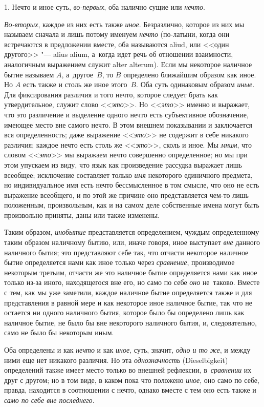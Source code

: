 1. Нечто и иное суть, {\em во-первых}, оба налично сущие или {\em нечто}.

{\em Во-вторых}, каждое из них есть также {\em иное}. Безразлично, которое из
них мы называем сначала и лишь потому именуем {\em нечто} (по-латыни, когда они
встречаются в предложении вместе, оба называются aliud, или <<один другого>>
"--- alius alium, а~когда идет речь об отношении взаимности, аналогичным
выражением служит alter alterum). Если мы некоторое наличное бытие называем
$A$, а~другое~$B$, то $B$ определено ближайшим образом как иное. Но $A$ есть
также и столь же иное этого~$B$. Оба суть одинаковым образом {\em иные}. Для
фиксирования различия и того нечто, которое следует брать как утвердительное,
служит слово <<{\em это}>>. Но <<{\em это}>> именно и выражает, что это
различение и выделение одного нечто есть субъективное обозначение, имеющее
место вне самого нечто. В этом внешнем показывании и заключается вся
определенность; даже выражение <<{\em это}>> не содержит в себе никакого
различия; каждое нечто есть столь же <<{\em это}>>, сколь и иное. Мы
{\em мним}, что словом <<{\em это}>> мы выражаем нечто совершенно определенное;
но мы при этом упускаем из виду, что язык как произведение рассудка выражает
лишь всеобщее; исключение составляет только {\em имя} некоторого единичного
предмета, но индивидуальное имя есть нечто бессмысленное в том смысле, что оно
не есть выражение всеобщего, и по этой же причине оно представляется чем-то
лишь положенным, произвольным, как и на самом деле собственные имена могут быть
произвольно приняты, даны или также изменены.

Таким образом, {\em инобытие} представляется определением, чуждым определенному
таким образом наличному бытию, или, иначе говоря, иное выступает {\em вне}
данного наличного бытия; это представляют себе так, что отчасти некоторое
наличное бытие определяется нами как иное только через {\em сравнение},
производимое некоторым третьим, отчасти же это наличное бытие определяется нами
как иное только из-за иного, находящегося вне его, но само по себе {\em оно}
не~таково. Вместе с тем, как мы уже заметили, каждое наличное бытие
определяется также и для представления в равной мере и как некоторое иное
наличное бытие, так что не остается ни одного наличного бытия, которое было бы
определено лишь как наличное бытие, не было бы вне некоторого наличного бытия,
и, следовательно, само не было бы некоторым иным.

Оба определены и как {\em нечто} и как {\em иное}, суть, значит,
{\em одно и то же}, и между ними еще нет никакого различия. Но эта
{\em однозначность} (Diesel\-bigkeit) определений также имеет место только во
внешней рефлексии, в~{\em сравнении} их друг с другом; но в том виде, в каком
пока что положено {\em иное}, оно само по себе, правда, находится в соотношении
с нечто, однако вместе с тем оно есть также и
{\em само по себе вне последнего}.

